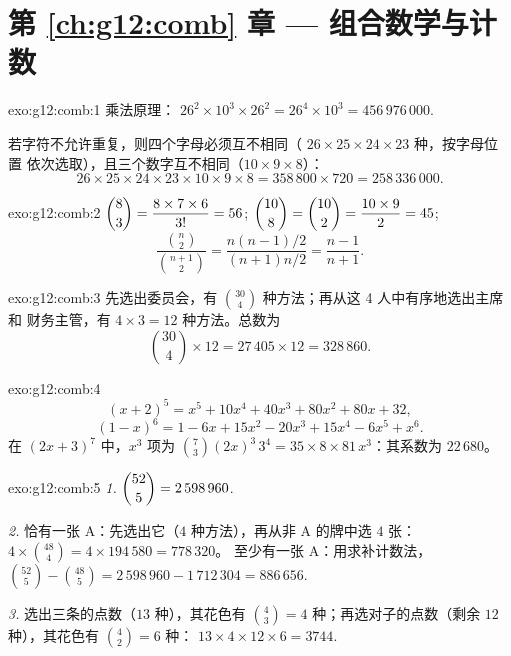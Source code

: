\section*{第 \ref{ch:g12:comb} 章 --- 组合数学与计数}

\begin{solution}{exo:g12:comb:1}
乘法原理：
$26^2 \times 10^3 \times 26^2 = 26^4 \times 10^3 = 456\,976\,000$.

若字符不允许重复，则四个字母必须互不相同（
$26 \times 25 \times 24 \times 23$ 种，按字母位置
依次选取），且三个数字互不相同（$10 \times 9 \times 8$）：
\[
26 \times 25 \times 24 \times 23 \times 10 \times 9 \times 8
= 358\,800 \times 720 = 258\,336\,000 .
\]
\end{solution}

\begin{solution}{exo:g12:comb:2}
$\dbinom83 = \dfrac{8 \times 7 \times 6}{3!} = 56$;
$\dbinom{10}{8} = \dbinom{10}{2} = \dfrac{10 \times 9}{2} = 45$;
\[
\frac{\binom n2}{\binom{n+1}2}
= \frac{n(n-1)/2}{(n+1)n/2} = \frac{n-1}{n+1}.
\]
\end{solution}

\begin{solution}{exo:g12:comb:3}
先选出委员会，有 $\binom{30}{4}$ 种方法；再从这 4 人中有序地选出主席和
财务主管，有 $4 \times 3 = 12$ 种方法。总数为
\[
\binom{30}{4} \times 12 = 27\,405 \times 12 = 328\,860 .
\]
\end{solution}

\begin{solution}{exo:g12:comb:4}
\[
(x+2)^5 = x^5 + 10x^4 + 40x^3 + 80x^2 + 80x + 32 ,
\]
\[
(1-x)^6 = 1 - 6x + 15x^2 - 20x^3 + 15x^4 - 6x^5 + x^6 .
\]
在 $(2x+3)^7$ 中，$x^3$ 项为
$\binom{7}{3}(2x)^3\,3^4 = 35 \times 8 \times 81\, x^3$：其系数为
$22\,680$。
\end{solution}

\begin{solution}{exo:g12:comb:5}
\emph{1.} $\dbinom{52}{5} = 2\,598\,960$.

\emph{2.} 恰有一张 A：先选出它（$4$ 种方法），再从非 A 的牌中选 $4$
张：$4 \times \binom{48}{4} = 4 \times 194\,580 = 778\,320$。
至少有一张 A：用求补计数法，
$\binom{52}{5} - \binom{48}{5} = 2\,598\,960 - 1\,712\,304 = 886\,656$.

\emph{3.} 选出三条的点数（$13$ 种），其花色有
$\binom43 = 4$ 种；再选对子的点数（剩余 $12$ 种），其花色有
$\binom42 = 6$ 种：
$13 \times 4 \times 12 \times 6 = 3744$.
\end{solution}


